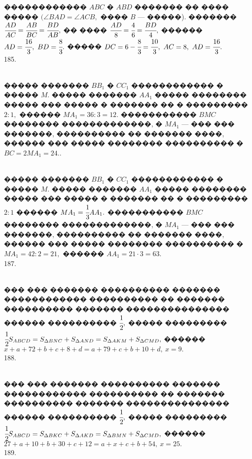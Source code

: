 \documentclass[12pt]{article}
\begin{document}
������������ $ABC$ � $ABD$ ������� �� ���� ����� $(\angle BAD = \angle ACB,$ ���� $B$ --- �����). ������� $\cfrac{AD}{AC}=\cfrac{AB}{BC}=\cfrac{BD}{AB},$ �� ����
$\cfrac{AD}{8}=\cfrac{4}{6}=\cfrac{BD}{4},$ ������ $AD=\cfrac{16}{3},\ BD=\cfrac{8}{3}.$ ����� $DC=6-\cfrac{8}{3}=\cfrac{10}{3},\ AC=8,\ AD=\cfrac{16}{3}.$\\
185. \begin{figure}[ht!]
\end{figure}\\
����� ������� $BB_1$ � $CC_1$ ������������ � ����� $M.$ ����� ������� $AA_1$ ����� �������� ����� ��� ����� � ������� �� � ��������� $2:1,$ ������ $MA_1=36:3=12.$ ����������� $BMC$ �������� �������������, � $MA_1$ --- ��� ��� �������, ���������� �� ������� ����, ������ ��� ����� �������� ���������� � $BC=2MA_1=24.$\newpage{}. \begin{figure}[ht!]
\end{figure}\\
����� ������� $BB_1$ � $CC_1$ ������������ � ����� $M.$ ����� ������� $AA_1$ ����� �������� ����� ��� ����� � ������� �� � ��������� $2:1$ ������ $MA_1=\cfrac{1}{3}AA_1.$ ����������� $BMC$ �������� �������������, � $MA_1$ --- ��� ��� �������, ���������� �� ������� ����, ������ ��� ����� �������� ���������� � $MA_1=42:2=21,$ ������ $AA_1=21\cdot3=63.$\\
187. \begin{figure}[ht!]
\end{figure}\\
��� ��� ������� ���������� ������� ������������ ���������� �� ������� ���������� ������� ��������������� ������ ���������� $\cfrac{1}{2},$ ����� ���������
$\cfrac{1}{2}S_{ABCD}=S_{\Delta BNC}+S_{\Delta AND}=S_{\Delta AKM}+S_{\Delta CMD},$ ������ $x+a+72+b+c+8+d=a+79+c+b+10+d,\ x=9.$\\
188. \begin{figure}[ht!]
\end{figure}\\
��� ��� ������� ���������� ������� ������������ ���������� �� ������� ���������� ������� ��������������� ������ ���������� $\cfrac{1}{2},$ ����� ���������
$\cfrac{1}{2}S_{ABCD}=S_{\Delta BKC}+S_{\Delta AKD}=S_{\Delta BMN}+S_{\Delta CMD},$ ������ $27+a+10+b+30+c+12=a+x+c+b+54,\ x=25.$\\
189. \begin{figure}[ht!]
\end{figure}\\
\end{document}
